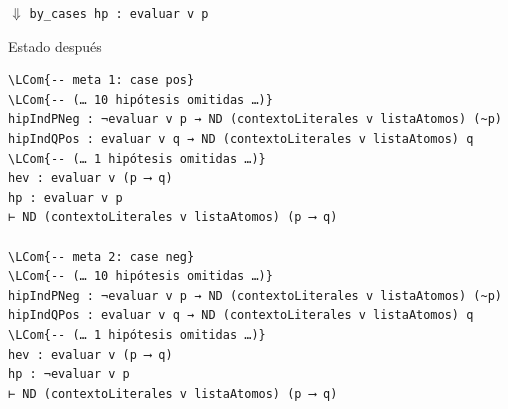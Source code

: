 \documentclass[11pt,a4paper]{article}
\newcommand{\LCom}[1]{\textcolor{com}{\itshape #1}}
\newcommand{\tacticaentre}[1]{\begin{center}\vspace{-2pt}\(\Downarrow\)\enspace
  \texttt{\small #1}\vspace{-2pt}\end{center}}
\begin{document}
\tacticaentre{by\_cases hp : evaluar v p}
\begin{estadolean}{Estado después}
\begin{Verbatim}[commandchars=\\\{\}]
\LCom{-- meta 1: case pos}
\LCom{-- (… 10 hipótesis omitidas …)}
hipIndPNeg : ¬evaluar v p → ND (contextoLiterales v listaAtomos) (~p)
hipIndQPos : evaluar v q → ND (contextoLiterales v listaAtomos) q
\LCom{-- (… 1 hipótesis omitidas …)}
hev : evaluar v (p ⟶ q)
hp : evaluar v p
⊢ ND (contextoLiterales v listaAtomos) (p ⟶ q)

\LCom{-- meta 2: case neg}
\LCom{-- (… 10 hipótesis omitidas …)}
hipIndPNeg : ¬evaluar v p → ND (contextoLiterales v listaAtomos) (~p)
hipIndQPos : evaluar v q → ND (contextoLiterales v listaAtomos) q
\LCom{-- (… 1 hipótesis omitidas …)}
hev : evaluar v (p ⟶ q)
hp : ¬evaluar v p
⊢ ND (contextoLiterales v listaAtomos) (p ⟶ q)
\end{Verbatim}
\end{estadolean}

\end{document}
